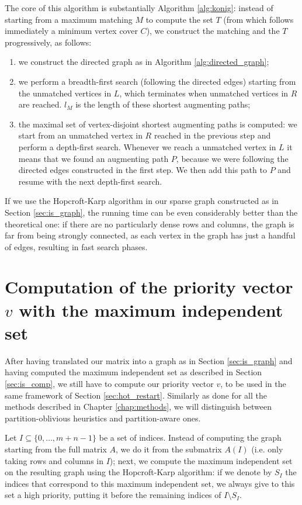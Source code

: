 The core of this algorithm is substantially Algorithm \ref{alg:konig}: instead of starting from a maximum matching $M$ to compute the set $T$ (from which follows immediately a minimum vertex cover $C$), we construct the matching and the $T$ progressively, as follows:

\begin{enumerate}
	\item we construct the directed graph as in Algorithm \ref{alg:directed_graph};
	\item we perform a breadth-first search (following the directed edges) starting from the unmatched vertices in $L$, which terminates when unmatched vertices in $R$ are reached. $l_M$ is the length of these shortest augmenting paths;
	\item the maximal set of vertex-disjoint shortest augmenting paths is computed: we start from an unmatched vertex in $R$ reached in the previous step and perform a depth-first search. Whenever we reach a unmatched vertex in $L$ it means that we found an augmenting path $P$, because we were following the directed edges constructed in the first step. We then add this path to $P$ and resume with the next depth-first search. 
\end{enumerate}

If we use the Hopcroft-Karp algorithm in our sparse graph constructed as in Section \ref{sec:is_graph}, the running time can be even considerably better than the theoretical one: if there are no particularly dense rows and columns, the graph is far from being strongly connected, as each vertex in the graph has just a handful of edges, resulting in fast search phases.

\section{Computation of the priority vector $v$ with the maximum independent set} \label{sec:is_vector}

After having translated our matrix into a graph as in Section \ref{sec:is_graph} and having computed the maximum independent set as described in Section \ref{sec:is_comp}, we still have to compute our priority vector $v$, to be used in the same framework of Section \ref{sec:hot_restart}. Similarly as done for all the methods described in Chapter \ref{chap:methods}, we will distinguish between partition-oblivious heuristics and partition-aware ones.

Let $I \subseteq \{ 0,\dots,m+n-1\}$ be a set of indices. Instead of computing the graph starting from the full matrix $A$, we do it from the submatrix $A(I)$ (i.e. only taking rows and columns in $I$); next, we compute the maximum independent set on the resulting graph using the Hopcroft-Karp algorithm: if we denote by $S_I$ the indices that correspond to this maximum independent set, we always give to this set a high priority, putting it before the remaining indices of $I \setminus S_I$. 

